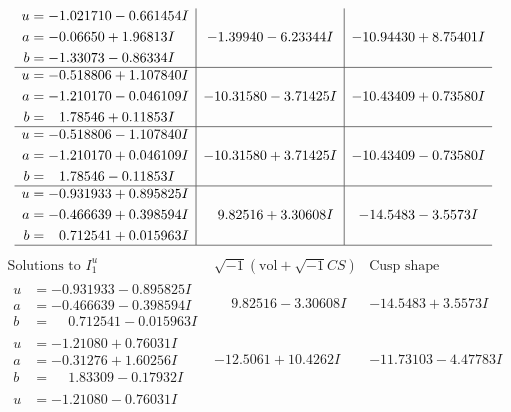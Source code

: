 \documentclass[1p]{elsarticle_modified}
\theoremstyle{definition}
\newcommand{\I}{\sqrt{-1}}
\begin{document}
$$\begin{array}{c|c|c}
\begin{aligned}
u &= -1.021710 - 0.661454 I \\
a &= -0.06650 + 1.96813 I \\
b &= -1.33073 - 0.86334 I\end{aligned}
 & -1.39940 - 6.23344 I & -10.94430 + 8.75401 I \\ \hline\begin{aligned}
u &= -0.518806 + 1.107840 I \\
a &= -1.210170 - 0.046109 I \\
b &= \phantom{-}1.78546 + 0.11853 I\end{aligned}
 & -10.31580 - 3.71425 I & -10.43409 + 0.73580 I \\ \hline\begin{aligned}
u &= -0.518806 - 1.107840 I \\
a &= -1.210170 + 0.046109 I \\
b &= \phantom{-}1.78546 - 0.11853 I\end{aligned}
 & -10.31580 + 3.71425 I & -10.43409 - 0.73580 I \\ \hline\begin{aligned}
u &= -0.931933 + 0.895825 I \\
a &= -0.466639 + 0.398594 I \\
b &= \phantom{-}0.712541 + 0.015963 I\end{aligned}
 & \phantom{-}9.82516 + 3.30608 I & -14.5483 - 3.5573 I\\
 \hline 
 \end{array}$$\newpage$$\begin{array}{c|c|c}  
\text{Solutions to }I^u_{1}& \I (\text{vol} + \sqrt{-1}CS) & \text{Cusp shape}\\
 \hline 
\begin{aligned}
u &= -0.931933 - 0.895825 I \\
a &= -0.466639 - 0.398594 I \\
b &= \phantom{-}0.712541 - 0.015963 I\end{aligned}
 & \phantom{-}9.82516 - 3.30608 I & -14.5483 + 3.5573 I \\ \hline\begin{aligned}
u &= -1.21080 + 0.76031 I \\
a &= -0.31276 + 1.60256 I \\
b &= \phantom{-}1.83309 - 0.17932 I\end{aligned}
 & -12.5061 + 10.4262 I & -11.73103 - 4.47783 I \\ \hline\begin{aligned}
u &= -1.21080 - 0.76031 I \\

\end{aligned}
\end{array}$$
\end{document}
